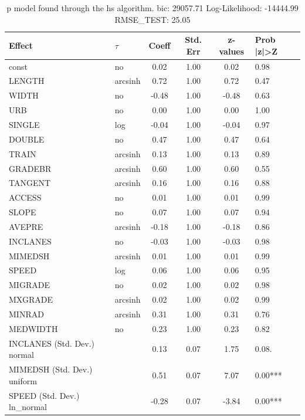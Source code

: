 \begin{table}
	\caption{p model found through the hs algorithm. bic: 29057.71 Log-Likelihood: -14444.99 RMSE_TEST: 25.05}
	\begin{center}
		\begin{tabular}{|l|l|c|c|c|l|}
			\hline
			Effect & $\tau$ & Coeff & Std. Err & z-values & Prob |z|>Z \\
			\hline
			const & no & 0.02 & 1.00 & 0.02 & 0.98 \\
			\hline
			LENGTH & arcsinh & 0.72 & 1.00 & 0.72 & 0.47 \\
			\hline
			WIDTH & no & -0.48 & 1.00 & -0.48 & 0.63 \\
			\hline
			URB & no & 0.00 & 1.00 & 0.00 & 1.00 \\
			\hline
			SINGLE & log & -0.04 & 1.00 & -0.04 & 0.97 \\
			\hline
			DOUBLE & no & 0.47 & 1.00 & 0.47 & 0.64 \\
			\hline
			TRAIN & arcsinh & 0.13 & 1.00 & 0.13 & 0.89 \\
			\hline
			GRADEBR & arcsinh & 0.60 & 1.00 & 0.60 & 0.55 \\
			\hline
			TANGENT & arcsinh & 0.16 & 1.00 & 0.16 & 0.88 \\
			\hline
			ACCESS & no & 0.01 & 1.00 & 0.01 & 0.99 \\
			\hline
			SLOPE & no & 0.07 & 1.00 & 0.07 & 0.94 \\
			\hline
			AVEPRE & arcsinh & -0.18 & 1.00 & -0.18 & 0.86 \\
			\hline
			INCLANES & no & -0.03 & 1.00 & -0.03 & 0.98 \\
			\hline
			MIMEDSH & arcsinh & 0.01 & 1.00 & 0.01 & 0.99 \\
			\hline
			SPEED & log & 0.06 & 1.00 & 0.06 & 0.95 \\
			\hline
			MIGRADE & no & 0.02 & 1.00 & 0.02 & 0.98 \\
			\hline
			MXGRADE & arcsinh & 0.02 & 1.00 & 0.02 & 0.99 \\
			\hline
			MINRAD & arcsinh & 0.31 & 1.00 & 0.31 & 0.76 \\
			\hline
			MEDWIDTH & no & 0.23 & 1.00 & 0.23 & 0.82 \\
			\hline
			INCLANES (Std. Dev.) normal &  & 0.13 & 0.07 & 1.75 & 0.08. \\
			\hline
			MIMEDSH (Std. Dev.) uniform &  & 0.51 & 0.07 & 7.07 & 0.00*** \\
			\hline
			SPEED (Std. Dev.) ln_normal &  & -0.28 & 0.07 & -3.84 & 0.00*** \\

\end{tabular}
\end{center}
\end{table}
